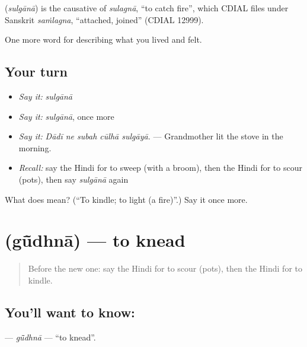 \begin{cousinweb}
\textbf{} (\emph{sulgānā}) is the causative of \emph{sulagnā}, \textquotedblleft{}to catch fire\textquotedblright{}, which CDIAL files under Sanskrit \emph{saṁlagna}, \textquotedblleft{}attached, joined\textquotedblright{} (CDIAL 12999).
\end{cousinweb}

\begin{grammarlens}[title={What you've built}]
One more word for describing what you lived and felt.
\end{grammarlens}

\subsection*{Your turn}
\begin{itemize}
\raggedright
  \item \emph{Say it:} \emph{sulgānā}
  \item \emph{Say it:} \emph{sulgānā}, once more
  \item \emph{Say it:} \emph{Dādī ne subah cūlhā sulgāyā.} — Grandmother lit the stove in the morning.
  \item \emph{Recall:} say the Hindi for to sweep (with a broom), then the Hindi for to scour (pots), then say \emph{sulgānā} again
\end{itemize}

\begin{tcolorbox}[breakable,colback=teal!4,colframe=teal!35!black,title={Before you move on}]
What does  mean? (\textquotedblleft{}To kindle; to light (a fire)\textquotedblright{}.) Say it once more.
\end{tcolorbox}
\section[\texorpdfstring{\hi{गूँधना} (gū̃dhnā)}{गूँधना (gū̃dhnā)}]{ (gū̃dhnā) — to knead}

\label{lesson:HI-C520-gudhna}



\begin{quote}
Before the new one: say the Hindi for to scour (pots), then the Hindi for to kindle.
\end{quote}

\subsection*{You'll want to know: }
\textbf{} — \emph{gū̃dhnā} — \textquotedblleft{}to knead\textquotedblright{}.

